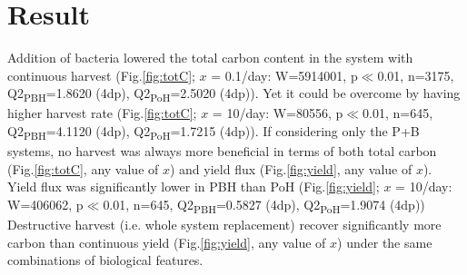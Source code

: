 \documentclass[../thesis.tex]{subfiles} %
\begin{document}
\section{Result}

Addition of bacteria lowered the total carbon content in the system with continuous harvest (Fig.\ref{fig:totC}; $x$ = 0.1/day: W=5914001, p$\ll$0.01, n=3175, Q2\textsubscript{PBH}=1.8620 (4dp), Q2\textsubscript{PoH}=2.5020 (4dp)).  Yet it could be overcome by having higher harvest rate (Fig.\ref{fig:totC}; $x$ = 10/day: W=80556, p$\ll$0.01, n=645, Q2\textsubscript{PBH}=4.1120 (4dp), Q2\textsubscript{PoH}=1.7215 (4dp)).  If considering only the P+B systems, no harvest was always more beneficial in terms of both total carbon (Fig.\ref{fig:totC}, any value of $x$) and yield flux (Fig.\ref{fig:yield}, any value of $x$).  Yield flux was significantly lower in PBH than PoH (Fig.\ref{fig:yield}; $x$ = 10/day: W=406062, p$\ll$0.01, n=645, Q2\textsubscript{PBH}=0.5827 (4dp), Q2\textsubscript{PoH}=1.9074 (4dp))  Destructive harvest (i.e. whole system replacement) recover significantly more carbon than continuous yield (Fig.\ref{fig:yield}, any value of $x$) under the same combinations of biological features.
\end{document}
